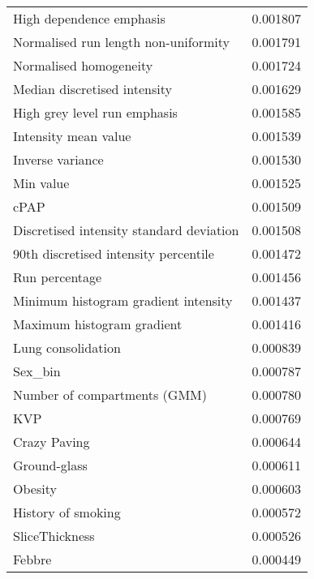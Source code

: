 \begin{tabular}{lr}
High dependence emphasis                           &        0.001807 \\
Normalised run length non-uniformity               &        0.001791 \\
Normalised homogeneity                             &        0.001724 \\
Median discretised intensity                       &        0.001629 \\
High grey level run emphasis                       &        0.001585 \\
Intensity mean value                               &        0.001539 \\
Inverse variance                                   &        0.001530 \\
Min value                                          &        0.001525 \\
cPAP                                               &        0.001509 \\
Discretised intensity standard deviation           &        0.001508 \\
90th discretised intensity percentile              &        0.001472 \\
Run percentage                                     &        0.001456 \\
Minimum histogram gradient intensity               &        0.001437 \\
Maximum histogram gradient                         &        0.001416 \\
Lung consolidation                                 &        0.000839 \\
Sex\_bin                                            &        0.000787 \\
Number of compartments (GMM)                       &        0.000780 \\
KVP                                                &        0.000769 \\
Crazy Paving                                       &        0.000644 \\
Ground-glass                                       &        0.000611 \\
Obesity                                            &        0.000603 \\
History of smoking                                 &        0.000572 \\
SliceThickness                                     &        0.000526 \\
Febbre                                             &        0.000449 \\

\end{tabular}

